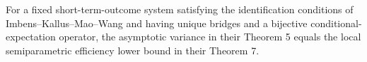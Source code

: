 For a fixed short-term-outcome system satisfying the identification conditions of Imbens--Kallus--Mao--Wang and having unique bridges and a bijective conditional-expectation operator, the asymptotic variance in their Theorem 5 equals the local semiparametric efficiency lower bound in their Theorem 7.